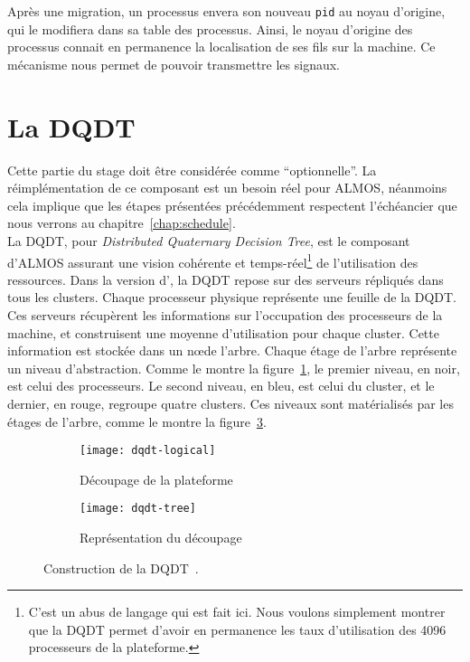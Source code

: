       Après une migration, un processus envera son nouveau \texttt{pid} au noyau
      d'origine, qui le modifiera dans sa table des processus. Ainsi, le noyau
      d'origine des processus connait en permanence la localisation de ses fils
      sur la machine. Ce mécanisme nous permet de pouvoir transmettre les
      signaux.


  \section{La DQDT}
  \label{sec:dqdt}

    Cette partie du stage doit être considérée comme ``optionnelle''. La
    réimplémentation de ce composant est un besoin réel pour ALMOS, néanmoins
    cela implique que les étapes présentées précédemment respectent l'échéancier
    que nous verrons au chapitre~\ref{chap:schedule}.\\

    La DQDT, pour \textit{Distributed Quaternary Decision Tree}, est le
    composant d'ALMOS assurant une vision cohérente et temps-réel\footnote{C'est
      un abus de langage qui est fait ici. Nous voulons simplement montrer que
      la DQDT permet d'avoir en permanence les taux d'utilisation des 4096
      processeurs de la plateforme.} de l'utilisation des ressources. Dans la
    version d'\citet{almaless2014universite}, la DQDT repose sur des serveurs
    répliqués dans tous les clusters. Chaque processeur physique représente une
    feuille de la DQDT. Ces serveurs récupèrent les informations sur
    l'occupation des processeurs de la machine, et construisent une moyenne
    d'utilisation pour chaque cluster. Cette information est stockée dans un
    n\oe de l'arbre. Chaque étage de l'arbre représente un niveau
    d'abstraction. Comme le montre la figure~\ref{fig:dqdt-logical}, le premier
    niveau, en noir, est celui des processeurs. Le second niveau, en bleu, est
    celui du cluster, et le dernier, en rouge, regroupe quatre clusters. Ces
    niveaux sont matérialisés par les étages de l'arbre, comme le montre la
    figure~\ref{fig:dqdt-tree}.\\

    \begin{figure}[ht]
      \begin{subfigure}[b]{0.5\textwidth}
        \texttt{[image: dqdt-logical]}
        \caption{Découpage de la plateforme}
        \label{fig:dqdt-logical}
      \end{subfigure}
      \begin{subfigure}[b]{0.4\textwidth}
        \texttt{[image: dqdt-tree]}
        \caption{Représentation du découpage}
        \label{fig:dqdt-tree}
      \end{subfigure}
      \caption{Construction de la DQDT~\citep{almaless2014universite}.}
    \end{figure}

